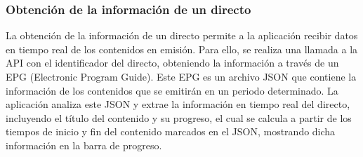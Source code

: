 \subsubsection{Obtención de la información de un directo}
\label{sec:obtencion_informacion_directo}

La obtención de la información de un directo permite a la aplicación recibir datos en tiempo real de los contenidos en emisión. Para ello, se realiza una llamada a la API 
con el identificador del directo, obteniendo la información a través de un EPG (Electronic Program Guide). Este EPG es un archivo JSON que contiene la información de los 
contenidos que se emitirán en un periodo determinado. La aplicación analiza este JSON y extrae la información en tiempo real del directo, incluyendo el título del contenido 
y su progreso, el cual se calcula a partir de los tiempos de inicio y fin del contenido marcados en el JSON, mostrando dicha información en la barra de progreso.
